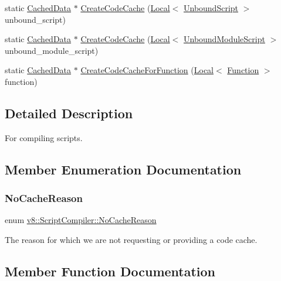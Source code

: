 \begin{DoxyCompactItemize}
\item 
static \mbox{\hyperlink{structv8_1_1ScriptCompiler_1_1CachedData}{Cached\+Data}} $\ast$ \mbox{\hyperlink{classv8_1_1ScriptCompiler_a3083edf7f887a38f1024d11c0dd7ccdb}{Create\+Code\+Cache}} (\mbox{\hyperlink{classv8_1_1Local}{Local}}$<$ \mbox{\hyperlink{classv8_1_1UnboundScript}{Unbound\+Script}} $>$ unbound\+\_\+script)
\item 
static \mbox{\hyperlink{structv8_1_1ScriptCompiler_1_1CachedData}{Cached\+Data}} $\ast$ \mbox{\hyperlink{classv8_1_1ScriptCompiler_af62a9c3e10c17aec5a99f48bff05f23e}{Create\+Code\+Cache}} (\mbox{\hyperlink{classv8_1_1Local}{Local}}$<$ \mbox{\hyperlink{classv8_1_1UnboundModuleScript}{Unbound\+Module\+Script}} $>$ unbound\+\_\+module\+\_\+script)
\item 
static \mbox{\hyperlink{structv8_1_1ScriptCompiler_1_1CachedData}{Cached\+Data}} $\ast$ \mbox{\hyperlink{classv8_1_1ScriptCompiler_a558a38d3be1394c153dc45e1eb059aa7}{Create\+Code\+Cache\+For\+Function}} (\mbox{\hyperlink{classv8_1_1Local}{Local}}$<$ \mbox{\hyperlink{classv8_1_1Function}{Function}} $>$ function)
\end{DoxyCompactItemize}


\subsection{Detailed Description}
For compiling scripts. 

\subsection{Member Enumeration Documentation}
\mbox{\label{classv8_1_1ScriptCompiler_a7f13fa15484cfc500ae51927756e0d60}} 
\subsubsection{\texorpdfstring{No\+Cache\+Reason}{NoCacheReason}}
{\footnotesize\ttfamily enum \mbox{\hyperlink{classv8_1_1ScriptCompiler_a7f13fa15484cfc500ae51927756e0d60}{v8\+::\+Script\+Compiler\+::\+No\+Cache\+Reason}}}

The reason for which we are not requesting or providing a code cache. 

\subsection{Member Function Documentation}
\mbox{\label{classv8_1_1ScriptCompiler_aea78877b0dccde1e587ee1ddeda1c155}} 
